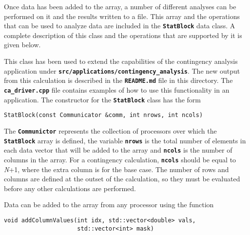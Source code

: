 Once data has been added to the array, a number of different analyses can be performed on it and the results written to a file. This array and the operations that can be used to analyze data are included in the \texttt{\textbf{StatBlock}} data class. A complete description of this class and the operations that are supported by it is given below.

This class has been used to extend the capabilities of the contingency analysis application under \texttt{\textbf{src/applications/contingency\_analysis}}. The new output from this calculation is described in the \texttt{\textbf{README.md}} file in this directory. The \texttt{\textbf{ca\_driver.cpp}} file contains examples of how to use this functionality in an application.
The constructor for the \texttt{\textbf{StatBlock}} class has the form

{
\color{red}
\begin{Verbatim}[fontseries=b]
StatBlock(const Communicator &comm, int nrows, int ncols)
\end{Verbatim}
}

The \texttt{\textbf{Communictor}} represents the collection of processors over
which the \texttt{\textbf{StatBlock}} array is defined, the variable
\texttt{\textbf{nrows}} is the total number of elements in each data vector that
will be added to the array and \texttt{\textbf{ncols}} is the number of columns
in the array. For a contingency calculation, \texttt{\textbf{ncols}} should be equal to \textit{N}+1, where the extra column is for the base case. The number of rows and columns are defined at the outset of the calculation, so they must be evaluated before any other calculations are performed.

Data can be added to the array from any processor using the function

{
\color{red}
\begin{Verbatim}[fontseries=b]
void addColumnValues(int idx, std::vector<double> vals,
                     std::vector<int> mask)
\end{Verbatim}
}

